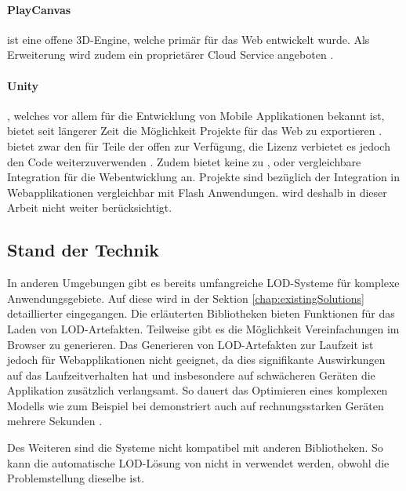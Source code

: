 \paragraph{PlayCanvas}
 ist eine offene 3D-Engine, welche primär für das Web entwickelt wurde. Als Erweiterung wird zudem ein proprietärer Cloud Service angeboten \cite{playcanvasNpmPackage}.

\paragraph{Unity}
, welches vor allem für die Entwicklung von Mobile Applikationen bekannt ist, bietet seit längerer Zeit die Möglichkeit Projekte für das Web zu exportieren \cite{unityWeb}.
 bietet zwar den  für Teile der  offen zur Verfügung, die Lizenz verbietet es jedoch den Code weiterzuverwenden \cite{unityOpenSource}.
Zudem bietet  keine zu ,  oder  vergleichbare Integration für die Webentwicklung an.  Projekte sind bezüglich der Integration in Webapplikationen vergleichbar mit Flash Anwendungen.  wird deshalb in dieser Arbeit nicht weiter berücksichtigt.

\subsection{Stand der Technik}

In anderen Umgebungen gibt es bereits umfangreiche LOD-Systeme für komplexe Anwendungsgebiete. Auf diese wird in der Sektion \autoref{chap:existingSolutions} detaillierter eingegangen.
Die erläuterten Bibliotheken bieten Funktionen für das Laden von LOD-Artefakten. Teilweise gibt es die Möglichkeit Vereinfachungen im Browser zu generieren. Das Generieren von LOD-Artefakten zur Laufzeit ist jedoch für Webapplikationen nicht geeignet, da dies signifikante Auswirkungen auf das Laufzeitverhalten hat und insbesondere auf schwächeren Geräten die Applikation zusätzlich verlangsamt.
So dauert das Optimieren eines komplexen Modells wie zum Beispiel bei  demonstriert auch auf rechnungsstarken Geräten mehrere Sekunden \cite{babylonAutoLod}.

Des Weiteren sind die Systeme nicht kompatibel mit anderen Bibliotheken. So kann die automatische LOD-Lösung von  nicht in  verwendet werden, obwohl die Problemstellung dieselbe ist.

